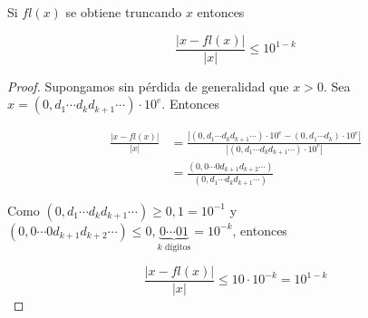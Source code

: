 \begin{propo}
Si $fl(x)$ se obtiene truncando $x$ entonces

\[\frac{|x - fl(x)|}{|x|} \leq 10^{1 - k}\]

\begin{proof}
Supongamos sin pérdida de generalidad que $x > 0$. Sea $x = (0,d_1 \cdots d_k d_{k + 1} \cdots) \cdot 10^e$. Entonces

\begin{align*}
\frac{|x - fl(x)|}{|x|} &= \frac{|(0,d_1\cdots d_k d_{k + 1}\cdots) \cdot 10^e - (0,d_1 \cdots d_k) \cdot 10^e|}{|(0,d_1\cdots d_k d_{k + 1} \cdots) \cdot 10^e|}\\
&= \frac{(0,0\cdots 0 d_{k + 1} d_{k + 2} \cdots )}{(0,d_1 \cdots d_k d_{k + 1} \cdots)}
\end{align*}

Como $(0,d_1 \cdots d_k d_{k + 1} \cdots) \geq 0,1 = 10^{-1}$ y $(0,0\cdots 0 d_{k + 1}d_{k + 2}\cdots) \leq 0,\underbrace{0\cdots 01}_{k \text{ dígitos}} = 10^{-k}$, entonces

\[\frac{|x - fl(x)|}{|x|} \leq 10 \cdot 10^{-k} = 10^{1 - k}\]

\end{proof}
\end{propo}

